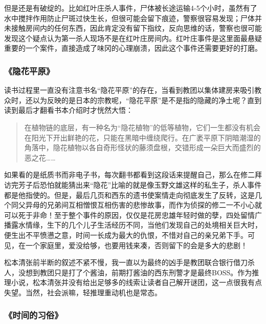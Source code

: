 但是还是有破绽的。比如红叶庄杀人事件，尸体被长途运输4-5个小时，虽然有了水中搅拌作用防止尸斑过快生长，但很可能会留下痕迹，警察很容易发现；尸体并未接触房间内的任何东西，因此肯定没有留下指纹，反向思维的话，警察也很可能发现这个疑点认为第一杀人现场不是在红叶庄房间内。红叶庄事件是这里面最悬疑重要的一个案件，直接造成了味冈的心理崩溃，因此这个事件还需要更好的打磨。

\subsubsection{《隐花平原》}
读书过程里一直没有注意书名“隐花平原”的存在，当看到教团以集体建房来吸引教众时，还以为反映的是日本的宗教呢，“隐花平原”是不是指的隐藏的净土呢？直到读到最后才翻看书本介绍时才恍然大悟：
\begin{quotation}
在植物链的底层，有一种名为“隐花植物”的低等植物，它们一生都没有机会在阳光下开出鲜艳的花，只能在黑暗中缠绕爬行。在广袤平原下阴暗潮湿的角落中，隐花植物以各自奇形怪状的藤须盘根，交错形成一朵巨大而盛烈的恶之花……
\end{quotation}
如果看的是纸质书而非电子书，每次翻书都看到这段话来提醒自己，那么在修二拜访完芳子后恐怕就能猜出来“隐花”比喻的就是像玉野文雄这样的私生子，杀人事件都是他指使的。但是，最后几页和西东的遗书使案情走向彻底发生了反转，这是几个同父异母的兄弟间互相憎恨互相伤害的悲惨故事，而作为侦探的修二一不小心就可以死于非命！至于整个事件的原因，仅仅是花房忠雄年轻时做的孽，四处留情广播露水情缘，生下的几个儿子生活经历不同，当他们发现自己的处境相关巨大时，便生出不平愤懑之意，时间一长成为最大的仇恨，不惜对自己的亲兄弟下手。可见，在一个家庭里，爱没给够，也要用钱来凑，否则留下的会是多大的悲剧！

松本清张前半断的叙述不紧不慢，我一直以为最终的凶手是教团联合银行借刀杀人，没想到教团只是打了个酱油，前期打酱油的西东刑警才是最终BOSS。作为推理小说，松本清张并没有给出足够多的线索让读者自己解开谜团，这一点很我有点失望。当然，社会派嘛，轻推理重动机也是常态。

\subsubsection{《时间的习俗》}